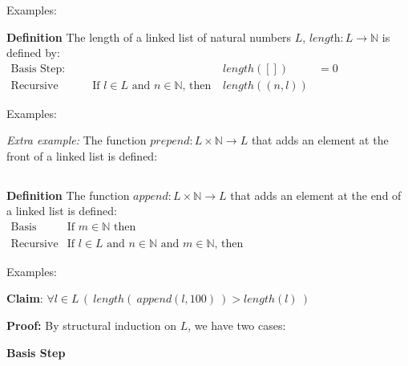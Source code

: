 \documentclass[12pt, oneside]{article}
\begin{document}
Examples: 

\vfill

{\bf Definition} The length of a linked list of natural numbers $L$, $\textit{length}: L \to \mathbb{N}$ is defined by:
\[
\begin{array}{llll}
\textrm{Basis Step:} &  & length([]) &= 0 \\
\textrm{Recursive Step:} & \textrm{If } l \in L\textrm{ and }n \in \mathbb{N}\textrm{, then  } & length((n, l))  &\phantom{= 1+ length(l)}
\end{array}
\]

Examples: 

\vfill


{\it Extra example:} The function $prepend : L \times \mathbb{N} \to L$ that adds an element at the front of a linked list is defined:
\[
\phantom{prepend(l, n) = (n, l)}
\]


\vfill

{\bf Definition} The function $\textit{append} : L \times \mathbb{N} \to L$ that adds an element at the end of a linked list is defined:
\[
\begin{array}{llll}
\textrm{Basis Step:} & \textrm{If } m \in \mathbb{N}\textrm{ then } & \phantom{\textit{append}([], m)} & \phantom{= (m, []) }\\
\textrm{Recursive Step:} & \textrm{If } l \in L\textrm{ and }n \in \mathbb{N}\textrm{ and }m \in \mathbb{N}\textrm{, then  } & \phantom{\textit{append}((n, l), m) } &\phantom{= (n, \textit{append}(l, m))}
\end{array}
\]

Examples: 

\vfill 

\newpage
{\bf Claim}: $\forall l \in L \, (~length(~append(l, 100)~) > length(l)~)$

{\bf Proof:} By structural induction on $L$, we have two cases:

\vspace{-10pt}

{\bf Basis Step}

\vspace{-10pt}
\end{document}

